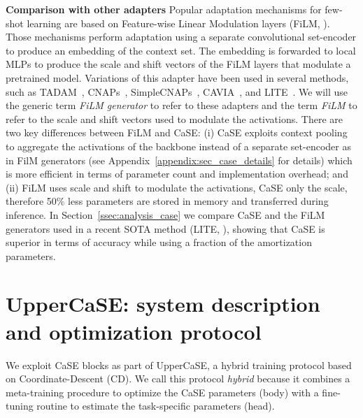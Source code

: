 \documentclass{article}
\begin{document}
\textbf{Comparison with other adapters} Popular adaptation mechanisms for few-shot learning are based on Feature-wise Linear Modulation layers (FiLM, \citealt{perez2018film}). Those mechanisms perform adaptation using a separate convolutional set-encoder to produce an embedding of the context set. The embedding is forwarded to local MLPs to produce the scale and shift vectors of the FiLM layers that modulate a pretrained model. Variations of this adapter have been used in several methods, such as TADAM~\citep{oreshkin2018tadam}, CNAPs~\citep{requeima2019fast}, SimpleCNAPs~\citep{bateni2020improved}, CAVIA~\citep{zintgraf2019fast}, and LITE~\citep{bronskill2021memory}. We will use the generic term \emph{FiLM generator} to refer to these adapters and the term \emph{FiLM} to refer to the scale and shift vectors used to modulate the activations.
There are two key differences between FiLM and CaSE: (i) CaSE exploits context pooling to aggregate the activations of the backbone instead of a separate set-encoder as in FilM generators (see Appendix~\ref{appendix:sec_case_details} for details) which is more efficient in terms of parameter count and implementation overhead; and (ii) FiLM uses scale and shift to modulate the activations, CaSE only the scale, therefore 50\% less parameters are stored in memory and transferred during inference.
In Section~\ref{ssec:analysis_case} we compare CaSE and the FiLM generators used in a recent SOTA method (LITE, \citealt{bronskill2021memory}), showing that CaSE is superior in terms of accuracy while using a fraction of the amortization parameters.

\section{UpperCaSE: system description and optimization protocol}

We exploit CaSE blocks as part of UpperCaSE, a hybrid training protocol based on Coordinate-Descent (CD). 
We call this protocol \emph{hybrid} because it combines a meta-training procedure to optimize the CaSE parameters (body) with a fine-tuning routine to estimate the task-specific parameters (head).
\end{document}
